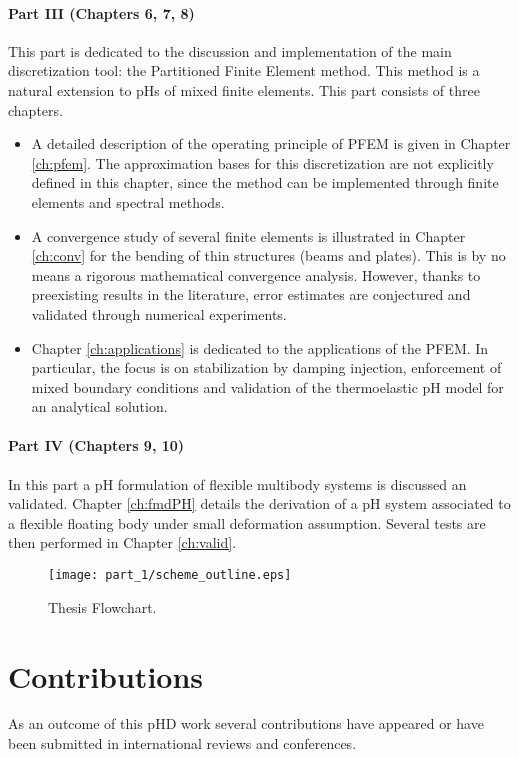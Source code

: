 \paragraph{Part III (Chapters 6, 7, 8)} This part is dedicated to the discussion and implementation of the main discretization tool: the Partitioned Finite Element method. This method is a natural extension to pHs of mixed finite elements. This part consists of three chapters.
\begin{itemize}
	\item A detailed description of the operating principle of PFEM is given in Chapter \ref{ch:pfem}. The approximation bases for this discretization are not explicitly defined in this chapter, since the method can be implemented through finite elements and spectral methods.
	\item A convergence study of several finite elements is illustrated in Chapter \ref{ch:conv} for the bending of thin structures (beams and plates). This is by no means a rigorous mathematical convergence analysis. However, thanks to preexisting results in the literature, error estimates are conjectured and validated through numerical experiments.
	\item Chapter \ref{ch:applications} is dedicated to the applications of the PFEM. In particular, the focus is on stabilization by damping injection, enforcement of mixed boundary conditions and validation of the thermoelastic pH model for an analytical solution.
\end{itemize}
 
\paragraph{Part IV (Chapters 9, 10)} In this part a pH formulation of flexible multibody systems is discussed an validated. Chapter \ref{ch:fmdPH} details the derivation of a pH system associated to a flexible floating body under small deformation assumption. Several tests are then performed in Chapter \ref{ch:valid}.


\begin{sidewaysfigure}
	\centering
	\texttt{[image: part\_1/scheme\_outline.eps]}%
	\caption[]{Thesis Flowchart.}%
	\label{fig:flowchart}%
\end{sidewaysfigure}

\section{Contributions}
As an outcome of this pHD work several contributions have appeared or have been submitted in international reviews and conferences. \\

